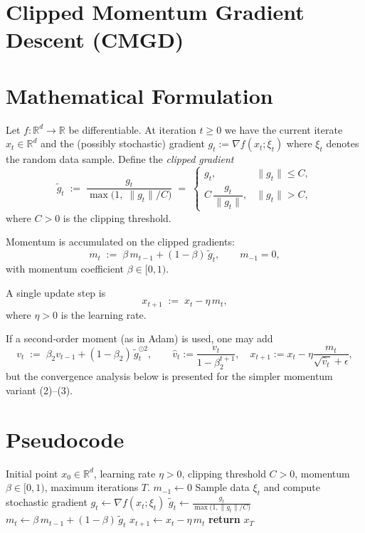 \documentclass{article}
\newcommand{\R}{\mathbb{R}}
\begin{document}
\section*{Clipped Momentum Gradient Descent (CMGD)}

\section*{Mathematical Formulation}
Let $f:\R^{d}\rightarrow\R$ be differentiable.  
At iteration $t\ge 0$ we have the current iterate $x_t\in\R^{d}$ and the (possibly stochastic) gradient $g_t:=\nabla f(x_t;\xi_t)$ where $\xi_t$ denotes the random data sample.  
Define the \emph{clipped gradient}
\[
\tilde g_t \;:=\; 
\frac{g_t}{\max\!\bigl(1,\;\|g_t\|/C\bigr)} 
\;=\;
\begin{cases}
g_t, & \|g_t\|\le C,\\[4pt]
C\,\dfrac{g_t}{\|g_t\|}, & \|g_t\|>C,
\end{cases}
\tag{1}
\]
where $C>0$ is the clipping threshold.  

Momentum is accumulated on the clipped gradients:
\[
m_t \;:=\; \beta\,m_{t-1}+(1-\beta)\,\tilde g_t,
\qquad m_{-1}=0,
\tag{2}
\]
with momentum coefficient $\beta\in[0,1)$.  

A single update step is
\[
x_{t+1}\;:=\;x_t-\eta\,m_t,
\tag{3}
\]
where $\eta>0$ is the learning rate.  

If a second‑order moment (as in Adam) is used, one may add
\[
v_t \;:=\; \beta_2 v_{t-1}+(1-\beta_2)\,\tilde g_t^{\odot 2},
\qquad 
\hat v_t:=\frac{v_t}{1-\beta_2^{t+1}},
\quad
x_{t+1}:=x_t-\eta\frac{m_t}{\sqrt{\hat v_t}+\epsilon},
\]
but the convergence analysis below is presented for the simpler momentum variant (2)–(3).

\section*{Pseudocode}
\begin{algorithm}[H]
\caption{Clipped Momentum Gradient Descent (CMGD)}
\begin{algorithmic}[1]
\Require Initial point $x_0\in\R^{d}$, learning rate $\eta>0$, clipping threshold $C>0$, momentum $\beta\in[0,1)$, maximum iterations $T$.
\State $m_{-1}\gets 0$
    \State Sample data $\xi_t$ and compute stochastic gradient $g_t\gets\nabla f(x_t;\xi_t)$
    \State $\displaystyle \tilde g_t\gets \frac{g_t}{\max\!\bigl(1,\|g_t\|/C\bigr)}$ \hfill{}
    \State $m_t\gets \beta\,m_{t-1}+(1-\beta)\,\tilde g_t$ \hfill{}
    \State $x_{t+1}\gets x_t-\eta\,m_t$ \hfill{}
\EndFor
\State \textbf{return} $x_T$
\end{algorithmic}
\end{algorithm}
\end{document}
